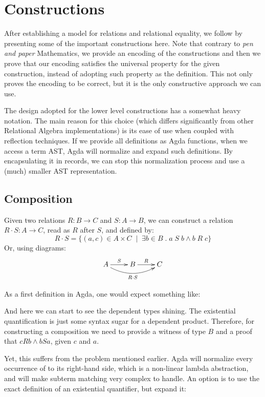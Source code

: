 \section{Constructions}

After establishing a model for relations and relational equality, we follow by presenting
some of the important constructions here. Note that contrary to \emph{pen and paper} Mathematics,
we provide an encoding of the constructions and then we prove that our encoding satisfies the
universal property for the given construction, instead of adopting such property as the
definition. This not only proves the encoding to be correct, but it is the only constructive approach
we can use.

The design adopted for the lower level constructions has a somewhat heavy notation. The
main reason for this choice (which differs significantly from other Relational Algebra implementations)
is its ease of use when coupled with reflection techniques. If we provide all definitions
as Agda functions, when we access a term AST, Agda will normalize and expand such definitions.
By encapsulating it in records, we can stop this normalization process and use a (much) smaller
AST representation.


\subsection{Composition}

Given two relations $R : B \rightarrow C$ and $S : A \rightarrow B$, we can construct a
relation $R \cdot S : A \rightarrow C$, read as $R$ after $S$, and defined by:
\[
  R \cdot S = \{ (a, c) \in A \times C\;\mid\; \exists b \in B\;.\; a\;S\;b \wedge b\;R\;c \}
\]
Or, using diagrams:
\begin{displaymath}
  \xymatrix{ A \ar[r]^S \ar@/_1pc/[rr]_{R \cdot S} & B \ar[r]^R & C }
\end{displaymath}

As a first definition in Agda, one would expect something like:


And here we can start to see the dependent types shining. The existential quantification
is just some syntax sugar for a dependent product. Therefore, for constructing a composition
we need to provide a witness of type $B$ and a proof that $c R b \wedge b S a$, given $c$ and $a$.

Yet, this suffers from the problem mentioned earlier. Agda will normalize every occurrence of 
to its right-hand side, which is a non-linear lambda abstraction, and will make subterm matching 
very complex to handle. An option is to use the exact definition of an existential quantifier,
but expand it:

